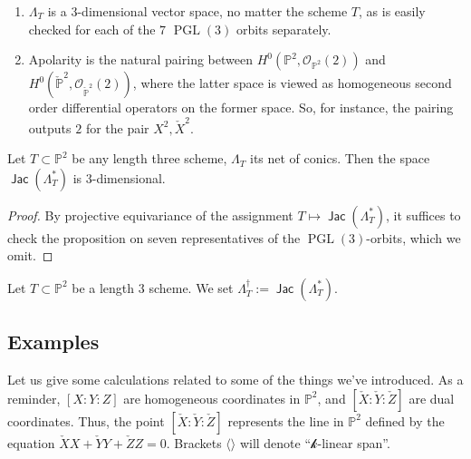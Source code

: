 \documentclass{article}
\renewcommand{\P}{\mathbb{P}}
\renewcommand{\k}{\mathscr{k}}
\DeclareMathOperator{\PGL}{PGL}
\renewcommand{\O}{\mathcal{O}}
\DeclareMathOperator{\jac}{\mathsf{Jac}}
\begin{document}
\begin{remark}
\label{remark:alwaysthreedimensional}
\begin{enumerate}
  \item $\Lambda_{T}$ is a $3$-dimensional vector space, no matter the
  scheme $T$, as is easily checked for each of the $7$ $\PGL(3)$
  orbits separately.
  \item Apolarity is the natural pairing between $H^{0}(\P^{2}, \O_{\P^{2}}(2))$ and $H^{0}(\check{\P}^{2}, \O_{\check{\P}^{2}}(2))$, where the latter space is viewed as homogeneous second order differential operators on the former space. So, for instance, the pairing outputs $2$ for the pair $X^{2}, \check{X}^{2}$.
\end{enumerate}
\end{remark}







\begin{proposition}
  \label{proposition:JacobianNet}
  Let $T \subset \P^{2}$ be any length three scheme, $\Lambda_{T}$ its
  net of conics. Then the space $\jac(\Lambda_{T}^{*})$ is 
  $3$-dimensional.

\end{proposition}

\begin{proof}
  By projective equivariance of the assignment
  $T \mapsto \jac(\Lambda_{T}^{*})$, it suffices to check the
  proposition on seven representatives of the $\PGL(3)$-orbits, which
  we omit.
\end{proof}

\begin{definition}
  \label{definition:dagger}
  Let $T \subset \P^{2}$ be a length $3$ scheme. We set
  $\Lambda_{T}^{\dagger} := \jac(\Lambda_{T}^{*})$.
\end{definition}


\subsection{Examples}
Let us give some calculations related to some of the things we've introduced. As a reminder, $[X:Y:Z]$ are homogeneous
coordinates in $\P^{2}$, and $[\check{X}:\check{Y}:\check{Z}]$ are dual
coordinates. Thus, the point $[\check{X}:\check{Y}:\check{Z}]$ represents the line in $\P^{2}$
defined by the equation $\check{X}X+\check{Y}Y+\check{Z}Z = 0$. Brackets $\langle \rangle $
will denote ``$\k$-linear span''.
\end{document}
